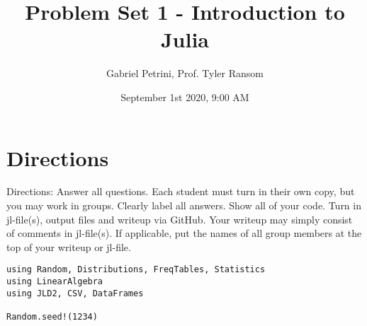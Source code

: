 \documentclass[11pt]{article}
\author{Gabriel Petrini, Prof. Tyler Ransom}
\date{September 1st 2020, 9:00 AM}
\title{Problem Set 1 - Introduction to Julia}
\begin{document}
\maketitle
\tableofcontents


\section{Directions}
\label{sec:orga57fdc3}

Directions: Answer all questions. Each student must turn in their own copy, but you may work
in groups. Clearly label all answers. Show all of your code. Turn in jl-file(s), output files and
writeup via GitHub. Your writeup may simply consist of comments in jl-file(s). If applicable, put
the names of all group members at the top of your writeup or jl-file.

\begin{verbatim}
using Random, Distributions, FreqTables, Statistics
using LinearAlgebra
using JLD2, CSV, DataFrames

Random.seed!(1234)
\end{verbatim}
\end{document}
